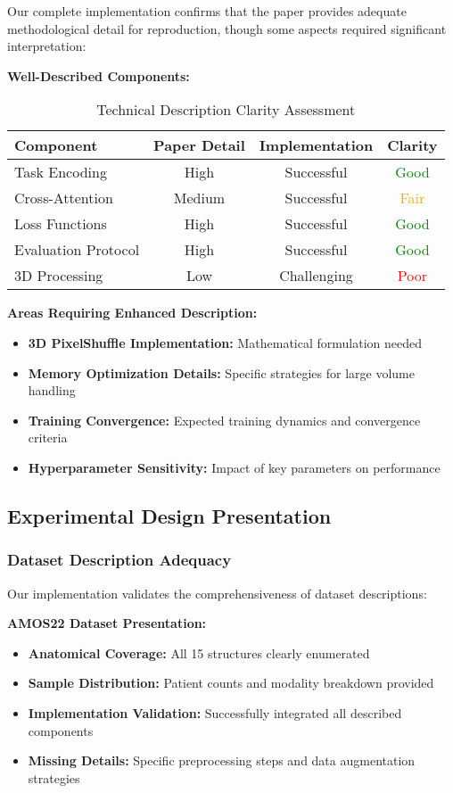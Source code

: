 Our complete implementation confirms that the paper provides adequate methodological detail for reproduction, though some aspects required significant interpretation:

\textbf{Well-Described Components:}
\begin{table}[h]
\centering
\small
\begin{tabular}{|l|c|c|c|}
\hline
\textbf{Component} & \textbf{Paper Detail} & \textbf{Implementation} & \textbf{Clarity} \\
\hline
Task Encoding & High & Successful & \textcolor{green}{Good} \\
Cross-Attention & Medium & Successful & \textcolor{orange}{Fair} \\
Loss Functions & High & Successful & \textcolor{green}{Good} \\
Evaluation Protocol & High & Successful & \textcolor{green}{Good} \\
3D Processing & Low & Challenging & \textcolor{red}{Poor} \\
\hline
\end{tabular}
\caption{Technical Description Clarity Assessment}
\label{tab:clarity_assessment}
\end{table}

\textbf{Areas Requiring Enhanced Description:}
\begin{itemize}
    \item \textbf{3D PixelShuffle Implementation:} Mathematical formulation needed
    \item \textbf{Memory Optimization Details:} Specific strategies for large volume handling
    \item \textbf{Training Convergence:} Expected training dynamics and convergence criteria
    \item \textbf{Hyperparameter Sensitivity:} Impact of key parameters on performance
\end{itemize}

\subsection{Experimental Design Presentation}

\subsubsection*{Dataset Description Adequacy}
Our implementation validates the comprehensiveness of dataset descriptions:

\textbf{AMOS22 Dataset Presentation:}
\begin{itemize}
    \item \textbf{Anatomical Coverage:} All 15 structures clearly enumerated
    \item \textbf{Sample Distribution:} Patient counts and modality breakdown provided
    \item \textbf{Implementation Validation:} Successfully integrated all described components
    \item \textbf{Missing Details:} Specific preprocessing steps and data augmentation strategies
\end{itemize}


